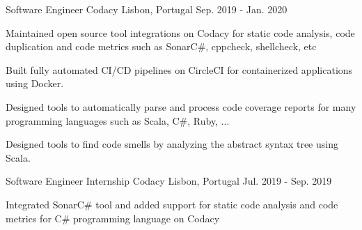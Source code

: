 

\begin{cventries}

  \cventry
    {Software Engineer} %
    {Codacy} %
    {Lisbon, Portugal} %
    {Sep. 2019 - Jan. 2020} %
    {
      \begin{cvitems} %
        \item {Maintained open source tool integrations on Codacy for static code analysis, code duplication and code metrics such as SonarC\#, cppcheck, shellcheck, etc}
        \item {Built fully automated CI/CD pipelines on CircleCI for containerized applications using Docker.}
        \item {Designed tools to automatically parse and process code coverage reports for many programming languages such as Scala, C\#, Ruby, ...}
        \item {Designed tools to find code smells by analyzing the abstract syntax tree using Scala.}
      \end{cvitems}
    }

  \cventry
    {Software Engineer Internship} %
    {Codacy} %
    {Lisbon, Portugal} %
    {Jul. 2019 - Sep. 2019} %
    {
      \begin{cvitems} %
        \item {Integrated SonarC\# tool and added support for static code analysis and code metrics for C\# programming language on Codacy}
      \end{cvitems}
    }

\end{cventries}
